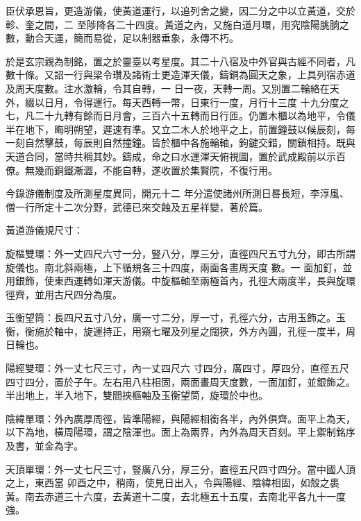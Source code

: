 \begin{pinyinscope}
 臣伏承恩旨，更造游儀，使黃道運行，以追列舍之變，因二分之中以立黃道，交於軫、奎之間，二
 至陟降各二十四度。黃道之內，又施白道月環，用究陰陽朓朒之數，動合天運，簡而易從，足以制器垂象，永傳不朽。



 於是玄宗親為制銘，置之於靈臺以考星度。其二十八宿及中外官與古經不同者，凡數十條。又詔一行與梁令瓚及諸術士更造渾天儀，鑄銅為圓天之象，上具列宿赤道及周天度數。注水激輪，令其自轉，一
 日一夜，天轉一周。又別置二輪絡在天外，綴以日月，令得運行。每天西轉一幣，日東行一度，月行十三度
 十九分度之七，凡二十九轉有餘而日月會，三百六十五轉而日行匝。仍置木櫃以為地平，令儀半在地下，晦明朔望，遲速有準。又立二木人於地平之上，前置鐘鼓以候辰刻，每一刻自然擊鼓，每辰則自然撞鐘。皆於櫃中各施輪軸，鉤鍵交錯，關鎖相持。既與天道合同，當時共稱其妙。鑄成，命之曰水運渾天俯視圖，置於武成殿前以示百僚。無幾而銅鐵漸澀，不能自轉，遂收置於集賢院，不復行用。



 今錄游儀制度及所測星度異同，開元十二
 年分遣使諸州所測日晷長短，李淳風、僧一行所定十二次分野，武德已來交蝕及五星祥變，著於篇。



 黃道游儀規尺寸：



 旋樞雙環：外一丈四尺六寸一分，豎八分，厚三分，直徑四尺五寸九分，即古所謂旋儀也。南北斜兩極，上下循規各三十四度，兩面各畫周天度
 數。一
 面加釘，並用銀飾，使東西運轉如渾天游儀。中旋樞軸至兩極首內，孔徑大兩度半，長與旋環徑齊，並用古尺四分為度。



 玉衡望筒：長四尺五寸八分，廣一寸二分，厚一寸，孔徑六分，古用玉飾之。玉衡，衡施於軸中，旋運持正，用窺七曜及列星之闊狹，外方內圓，孔徑一度半，周日輪也。



 陽經雙環：外一丈七尺三寸，內一丈四尺六
 寸四分，廣四寸，厚四分，直徑五尺四寸四分，置於子午。左右用八柱相固，兩面畫周天度數，一面加釘，並銀飾之。半出地上，半入地下，雙間挾樞軸及玉衡望筒，旋環於中也。



 陰緯單環：外內廣厚周徑，皆準陽經，與陽經相銜各半，內外俱齊。面平上為天，以下為地，橫周陽環，謂之陰渾也。面上為兩界，內外為周天百刻。平上禦制銘序及書，並金為字。



 天頂單環：外一丈七尺三寸，豎廣八分，厚三分，直徑五尺四寸四分。當中國人頂之上，東西當
 卯酉之中，稍南，使見日出入，令與陽經、陰緯相固，如殼之裹黃。南去赤道三十六度，去黃道十二度，去北極五十五度，去南北平各九十一度強。




\end{pinyinscope}
